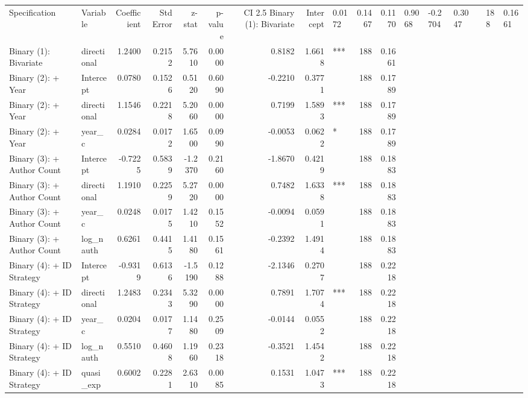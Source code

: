 \begin{tabular}{llrrrrrrlrr}
\toprule
Specification & Variable & Coefficient & Std Error & z-stat & p-value & CI 2.5%
\midrule
Binary (1): Bivariate & Intercept & 0.0172 & 0.1467 & 0.1170 & 0.9068 & -0.2704 & 0.3047 &  & 188 & 0.1661 \\
Binary (1): Bivariate & directional & 1.2400 & 0.2152 & 5.7610 & 0.0000 & 0.8182 & 1.6618 & *** & 188 & 0.1661 \\
Binary (2): + Year & Intercept & 0.0780 & 0.1526 & 0.5120 & 0.6090 & -0.2210 & 0.3771 &  & 188 & 0.1789 \\
Binary (2): + Year & directional & 1.1546 & 0.2218 & 5.2060 & 0.0000 & 0.7199 & 1.5893 & *** & 188 & 0.1789 \\
Binary (2): + Year & year_c & 0.0284 & 0.0172 & 1.6500 & 0.0990 & -0.0053 & 0.0622 & * & 188 & 0.1789 \\
Binary (3): + Author Count & Intercept & -0.7225 & 0.5839 & -1.2370 & 0.2160 & -1.8670 & 0.4219 &  & 188 & 0.1883 \\
Binary (3): + Author Count & directional & 1.1910 & 0.2259 & 5.2720 & 0.0000 & 0.7482 & 1.6338 & *** & 188 & 0.1883 \\
Binary (3): + Author Count & year_c & 0.0248 & 0.0175 & 1.4210 & 0.1552 & -0.0094 & 0.0591 &  & 188 & 0.1883 \\
Binary (3): + Author Count & log_nauth & 0.6261 & 0.4415 & 1.4180 & 0.1561 & -0.2392 & 1.4914 &  & 188 & 0.1883 \\
Binary (4): + ID Strategy & Intercept & -0.9319 & 0.6136 & -1.5190 & 0.1288 & -2.1346 & 0.2707 &  & 188 & 0.2218 \\
Binary (4): + ID Strategy & directional & 1.2483 & 0.2343 & 5.3290 & 0.0000 & 0.7891 & 1.7074 & *** & 188 & 0.2218 \\
Binary (4): + ID Strategy & year_c & 0.0204 & 0.0177 & 1.1480 & 0.2509 & -0.0144 & 0.0552 &  & 188 & 0.2218 \\
Binary (4): + ID Strategy & log_nauth & 0.5510 & 0.4608 & 1.1960 & 0.2318 & -0.3521 & 1.4542 &  & 188 & 0.2218 \\
Binary (4): + ID Strategy & quasi_exp & 0.6002 & 0.2281 & 2.6310 & 0.0085 & 0.1531 & 1.0473 & *** & 188 & 0.2218 \\
\bottomrule
\end{tabular}
